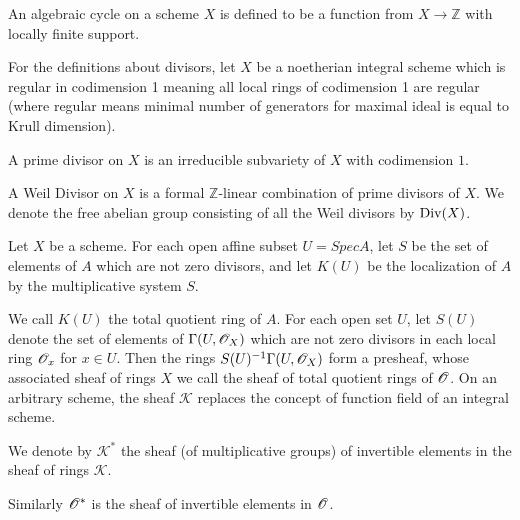 \begin{definition}
  \label{def:algcycle}
  \leanok
  An algebraic cycle on a scheme $X$ is defined to be a function from
  $X \rightarrow \mathbb{Z}$ with locally finite support.
\end{definition}

\begin{definition}
  \label{def:pushcycle}
  \leanok



\end{definition}


For the definitions about divisors, let $X$ be a noetherian integral scheme
which is regular in codimension 1 meaning all local rings of codimension 1 are
regular (where regular means minimal number of generators for maximal ideal is
equal to Krull dimension).

\begin{definition}\label{def:primediv}
  A prime divisor on $X$ is an irreducible subvariety of $X$ with codimension $1$.
  \end{definition}

\begin{definition}\label{def:weil}
  A Weil Divisor on $X$ is a formal $\mathbb{Z}$-linear combination of prime divisors of $X$. We denote the free abelian group consisting of all the Weil divisors by $\operatorname{Div}(X)$.
\end{definition}

\begin{definition}[Hartshorne p.140]\label{def:constratsheaf}
  Let $X$ be a scheme. For each open affine subset $U = Spec A$,
  let $S$ be the set of elements of $A$ which are not zero divisors,
  and let $K(U)$ be the localization of $A$ by the multiplicative system $S$.

  We call $K(U)$ the total quotient ring of $A$.
  For each open set $U$, let $S(U)$ denote the set of elements of
  $\Gamma(U, \mathscr{O}_X)$ which are not zero divisors in each local ring $\mathscr{O}_x$ for $x \in U$.
  Then the rings $S(U)^{-1} \Gamma(U,\mathscr{O}_X)$ form a presheaf,
  whose associated sheaf of rings $X$ we call the sheaf of total quotient rings
  of $\mathscr{O}$. On an arbitrary scheme, the sheaf $\mathscr{K}$ replaces the concept
  of function field of an integral scheme.

  We denote by $\mathscr{K}^*$ the sheaf (of multiplicative groups)
  of invertible elements in the sheaf of rings $\mathscr{K}$.

  Similarly $\mathscr{O}^*$ is the sheaf of invertible elements in $\mathscr{O}$.
\end{definition}

